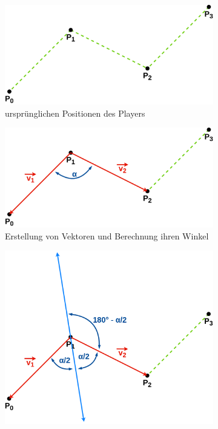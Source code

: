 \documentclass[doktyp=studarbeit]{TUBAFarbeiten}
\begin{document}
\begin{figure}[!htb]
    \centering
    \begin{subfigure}[b]{0.35\textwidth}
        \centering
        \includegraphics[width=1\linewidth]{Schlangenlinie-1.png}
        \caption{ursprünglichen Positionen des Players}
    \end{subfigure}
    \qquad
    \begin{subfigure}[b]{0.35\textwidth}
        \centering
        \includegraphics[width=1\linewidth]{Schlangenlinie-2.png}
        \caption{Erstellung von Vektoren und Berechnung ihren Winkel}
    \end{subfigure}
    \qquad
    \begin{subfigure}[b]{0.35\textwidth}
        \centering
        \includegraphics[width=1\linewidth]{Schlangenlinie-3.png}

\end{subfigure}
\end{figure}
\end{document}
